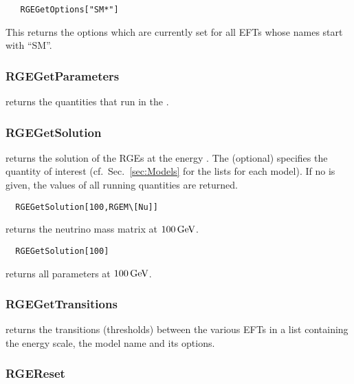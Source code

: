 \documentclass[10pt,a4paper,twoside]{scrartcl}
\begin{document}
  \begin{verbatim}
   RGEGetOptions["SM*"]
 \end{verbatim}
 This returns the options which are currently set for all EFTs whose
 names start with ``SM''.
 

\subsubsection{RGEGetParameters}

 returns the quantities that run
in the .
% 
% 

\subsubsection{RGEGetSolution}

\label{sec:RGEGetSolution}
returns the solution of the RGEs at the energy .
The  (optional) specifies the quantity
of interest (cf.\ Sec.~\ref{sec:Models} for the lists for each model).
If no  is given, the values of all running
quantities are returned.


\begin{verbatim}
  RGEGetSolution[100,RGEM\[Nu]]
\end{verbatim}
returns the neutrino mass matrix at $100\,\mathrm{GeV}$.
\begin{verbatim}
  RGEGetSolution[100]
\end{verbatim}
returns all parameters at $100\,\mathrm{GeV}$.



\subsubsection{RGEGetTransitions}

 returns the transitions (thresholds)
between the various EFTs in a list
containing the energy scale, the model name and its options.
%
%


\subsubsection{RGEReset}
\end{document}
